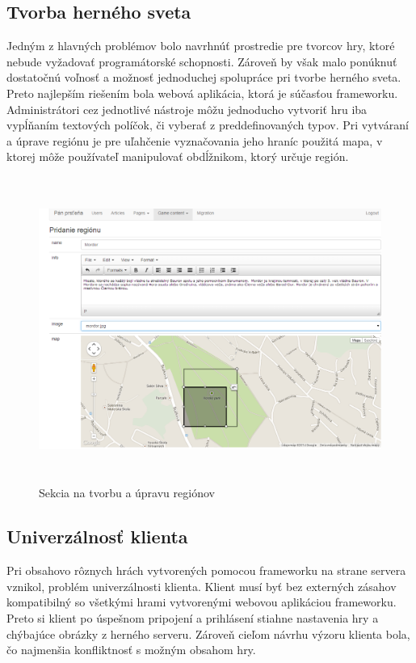 \subsection{Tvorba herného sveta}
Jedným z hlavných problémov bolo navrhnúť prostredie pre tvorcov hry, ktoré nebude vyžadovať programátorské schopnosti. Zároveň by však malo ponúknuť dostatočnú voľnosť a možnosť jednoduchej spolupráce pri tvorbe herného sveta. Preto najlepším riešením bola webová aplikácia, ktorá je súčasťou frameworku. Administrátori cez jednotlivé nástroje môžu jednoducho vytvoriť hru iba vypĺňaním textových políčok, či vyberať z preddefinovaných typov. Pri vytváraní a úprave regiónu je pre uľahčenie vyznačovania jeho hraníc použitá mapa, v ktorej môže používateľ manipulovať obdĺžnikom, ktorý určuje región. 

\begin{figure}[h]
  \centering
  \includegraphics[height=10cm]{mainmatter/imgs/server_pridanieregionu.png}
  \caption{Sekcia na tvorbu a úpravu regiónov}
  \label{fig:server_tvorbaRegionu}
\end{figure}

\subsection{Univerzálnosť klienta}
Pri obsahovo rôznych hrách vytvorených pomocou frameworku na strane servera vznikol, problém univerzálnosti klienta. Klient musí byť bez externých zásahov kompatibilný so všetkými hrami vytvorenými webovou aplikáciou frameworku. Preto si klient po úspešnom pripojení a prihlásení stiahne nastavenia hry a chýbajúce obrázky z herného serveru. Zároveň cieľom návrhu výzoru klienta bola, čo najmenšia konfliktnosť s možným obsahom hry.

